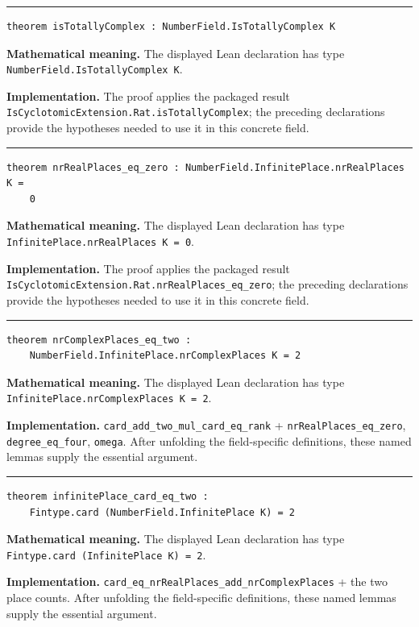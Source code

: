 \documentclass[UTF8,a4paper,11pt,fontset=fandol]{ctexart}
\theoremstyle{definition}
\newcommand{\statementsep}{\par\medskip\hrule\medskip}
\begin{document}
\statementsep
\begin{verbatim}
theorem isTotallyComplex : NumberField.IsTotallyComplex K
\end{verbatim}
\noindent\textbf{Mathematical meaning.} The displayed Lean declaration has type \texttt{NumberField.\allowbreak{}IsTotallyComplex K}.\par
\noindent\textbf{Implementation.} The proof applies the packaged result \texttt{IsCyclotomicExtension.\allowbreak{}Rat.\allowbreak{}isTotallyComplex}; the preceding declarations provide the hypotheses needed to use it in this concrete field.\par
\statementsep
\begin{verbatim}
theorem nrRealPlaces_eq_zero : NumberField.InfinitePlace.nrRealPlaces K =
    0
\end{verbatim}
\noindent\textbf{Mathematical meaning.} The displayed Lean declaration has type \texttt{InfinitePlace.\allowbreak{}nrRealPlaces K = 0}.\par
\noindent\textbf{Implementation.} The proof applies the packaged result \texttt{IsCyclotomicExtension.\allowbreak{}Rat.\allowbreak{}nrRealPlaces\_\allowbreak{}eq\_\allowbreak{}zero}; the preceding declarations provide the hypotheses needed to use it in this concrete field.\par
\statementsep
\begin{verbatim}
theorem nrComplexPlaces_eq_two :
    NumberField.InfinitePlace.nrComplexPlaces K = 2
\end{verbatim}
\noindent\textbf{Mathematical meaning.} The displayed Lean declaration has type \texttt{InfinitePlace.\allowbreak{}nrComplexPlaces K = 2}.\par
\noindent\textbf{Implementation.} \texttt{card\_\allowbreak{}add\_\allowbreak{}two\_\allowbreak{}mul\_\allowbreak{}card\_\allowbreak{}eq\_\allowbreak{}rank} + \texttt{nrRealPlaces\_\allowbreak{}eq\_\allowbreak{}zero}, \texttt{degree\_\allowbreak{}eq\_\allowbreak{}four}, \texttt{omega}. After unfolding the field-specific definitions, these named lemmas supply the essential argument.\par
\statementsep
\begin{verbatim}
theorem infinitePlace_card_eq_two :
    Fintype.card (NumberField.InfinitePlace K) = 2
\end{verbatim}
\noindent\textbf{Mathematical meaning.} The displayed Lean declaration has type \texttt{Fintype.\allowbreak{}card (InfinitePlace K) = 2}.\par
\noindent\textbf{Implementation.} \texttt{card\_\allowbreak{}eq\_\allowbreak{}nrRealPlaces\_\allowbreak{}add\_\allowbreak{}nrComplexPlaces} + the two place counts. After unfolding the field-specific definitions, these named lemmas supply the essential argument.\par
\end{document}
